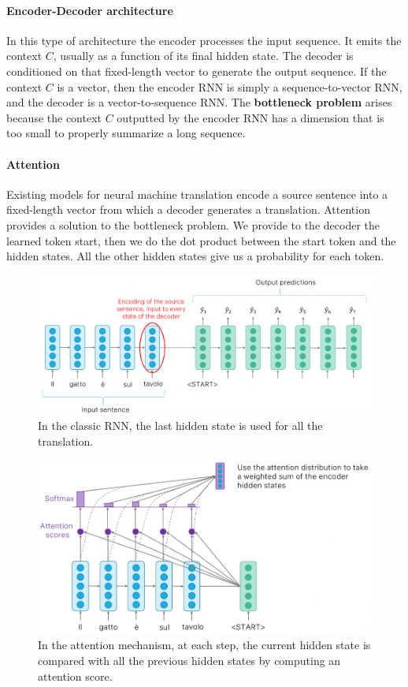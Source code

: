 \paragraph{Encoder-Decoder architecture}
In this type of architecture the encoder processes the input sequence.
It emits the context $C$, usually as a function of its final hidden state.
The decoder is conditioned on that fixed-length vector to generate the output sequence.
If the context $C$ is a vector, then the encoder RNN is simply a sequence-to-vector RNN, and the decoder is a vector-to-sequence RNN.
The \textbf{bottleneck problem} arises because the context $C$ outputted by the encoder RNN has a dimension that is too small to properly summarize a long sequence.

\paragraph{Attention}
Existing models for neural machine translation encode a source sentence into a fixed-length vector from which a decoder generates a translation.
Attention provides a solution to the bottleneck problem. 
We provide to the decoder the learned token start, then we do the dot product between the start token and the hidden states.
All the other hidden states give us a probability for each token.

\begin{figure}[htbp]
  \centering
  \includegraphics[width=0.7\linewidth]{./img/rnn_classic.png}
  \caption{In the classic RNN, the last hidden state is used for all the translation.}
\end{figure}

\begin{figure}[htbp]
  \centering
  \includegraphics[width=0.7\linewidth]{./img/attention.png}
  \caption{In the attention mechanism, at each step, the current hidden state is compared with all the previous hidden states by computing an attention score.}
\end{figure}

